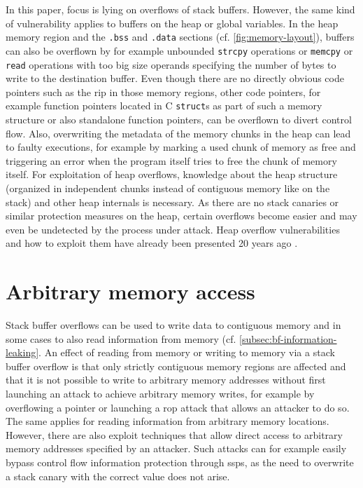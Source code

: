 In this paper, focus is lying on overflows of stack buffers.
However, the same kind of vulnerability applies to buffers on the heap or global variables.
In the heap memory region and the \texttt{.bss} and \texttt{.data} sections (cf. \cref{fig:memory-layout}), buffers can also be overflown by for example unbounded \texttt{strcpy} operations or \texttt{memcpy} or \texttt{read} operations with too big size operands specifying the number of bytes to write to the destination buffer.
Even though there are no directly obvious code pointers such as the \gls{rip} in those memory regions, other code pointers, for example function pointers located in C \texttt{struct}s as part of such a memory structure or also standalone function pointers, can be overflown to divert control flow.
Also, overwriting the metadata of the memory chunks in the heap can lead to faulty executions, for example by marking a used chunk of memory as free and triggering an error when the program itself tries to free the chunk of memory itself.
For exploitation of heap overflows, knowledge about the heap structure (organized in independent chunks instead of contiguous memory like on the stack) and other heap internals is necessary.
As there are no stack canaries or similar protection measures on the heap, certain overflows become easier and may even be undetected by the process under attack.
Heap overflow vulnerabilities and how to exploit them have already been presented 20 years ago \cite{Anonymous2001,Kaempf2001,SolarDesigner2000}.

\section{Arbitrary memory access}
\label{sec:arbitrary-memory-access}

Stack buffer overflows can be used to write data to contiguous memory and in some cases to also read information from memory (cf. \cref{subsec:bf-information-leaking}.
An effect of reading from memory or writing to memory via a stack buffer overflow is that only strictly contiguous memory regions are affected and that it is not possible to write to arbitrary memory addresses without first launching an attack to achieve arbitrary memory writes, for example by overflowing a pointer or launching a \gls{rop} attack that allows an attacker to do so.
The same applies for reading information from arbitrary memory locations.
However, there are also exploit techniques that allow direct access to arbitrary memory addresses specified by an attacker.
Such attacks can for example easily bypass control flow information protection through \glspl{ssp}, as the need to overwrite a stack canary with the correct value does not arise.

